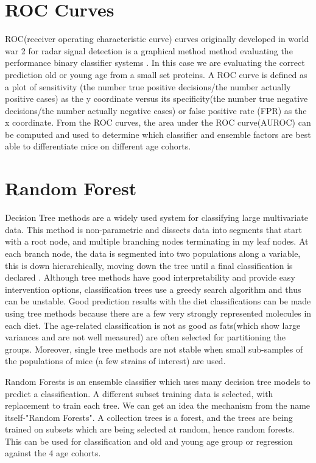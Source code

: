 \documentclass[a4paper,11pt,twoside]{book}
\begin{document}
	\section{ROC Curves}
	
	ROC(receiver operating characteristic curve) curves originally developed in world war 2 for radar signal detection is a graphical method method evaluating the performance binary classifier systems \citep{HajianTilaki2013}. In this case we are evaluating the correct prediction old or young age from a small set proteins. A ROC curve is defined as a plot of sensitivity (the number true positive decisions/the number actually positive cases) as the y coordinate versus its specificity(the number true negative decisions/the number actually negative cases) or false positive rate (FPR) as the x coordinate. From the ROC curves, the area under the ROC curve(AUROC) can be computed and used to determine which classifier and ensemble factors are best able to differentiate mice on different age cohorts.
	
	\section{Random Forest}
	
    Decision Tree methods are a widely used system for classifying large multivariate data. This method is non-parametric and dissects data into segments that start with a root node, and multiple branching nodes terminating in my leaf nodes. At each branch node, the data is segmented into two populations along a variable, this is down hierarchically, moving down the tree until a final classification is declared \citep{Song2015DecisionTrees}. Although tree methods have good interpretability and provide easy intervention options, classification trees use a greedy search algorithm and thus can be unstable\citep{Song2015DecisionTrees}. Good prediction results with the diet classifications can be made using tree methods because there are a few very strongly represented molecules in each diet. The age-related classification is not as good as fats(which show large variances and are not well measured) are often selected for partitioning the groups. Moreover, single tree methods are not stable when small sub-samples of the populations of mice (a few strains of interest) are used.
	
	Random Forests is an ensemble classifier which uses many decision tree models to predict a classification. A different subset training data is selected, with replacement to train each tree\citep{Goel2017RandomForest}. We can get an idea the mechanism from the name itself-"Random Forests". A collection trees is a forest, and the trees are being trained on subsets which are being selected at random, hence random forests\citep{Goel2017RandomForest}. This can be used for classification and old and young age group or regression against the 4 age cohorts.
	
\end{document}
